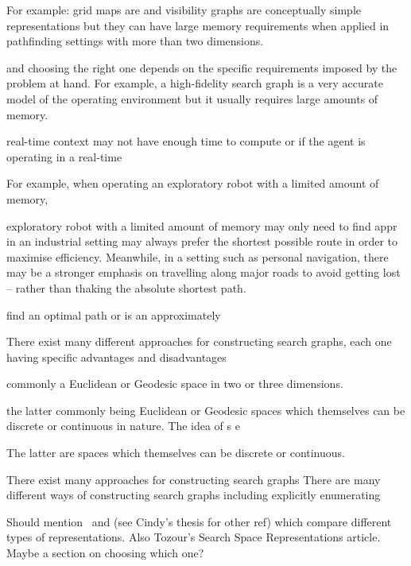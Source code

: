 For example: grid maps are and visibility graphs are conceptually simple 
representations but they can have large memory requirements when applied 
in pathfinding settings with more than two dimensions.

and choosing the right one depends on the specific requirements
imposed by the problem at hand. For example, a high-fidelity 
search graph is a very accurate model of the operating
environment but it usually requires large amounts of memory.

real-time context may not have enough time to compute
or if the agent is operating in a real-time 

For example, when operating
an exploratory robot with a limited amount of memory, 

 exploratory 
robot with a limited amount of memory may only need to find appr
in an industrial setting may always prefer the shortest possible
route in order to maximise efficiency. Meanwhile, in a setting such
as personal navigation, there may be a stronger emphasis on travelling
along major roads to avoid getting lost -- rather than thaking the 
absolute shortest path. 

find an optimal path or is an approximately 


There exist many different approaches for constructing search graphs, 
each one having specific advantages and disadvantages


commonly a Euclidean or Geodesic space in two or three dimensions.

the
latter commonly being Euclidean or Geodesic spaces which themselves 
can be discrete or continuous in nature.
The idea of s e

The latter are spaces which themselves can be discrete or continuous.

There exist many approaches for constructing search graphs
There are many different ways of constructing search graphs including
explicitly enumerating 

Should mention~\citep{yap02} and (see Cindy's thesis for other ref) which 
compare different types of representations. Also Tozour's Search Space Representations
article.
Maybe a section on choosing which one?

